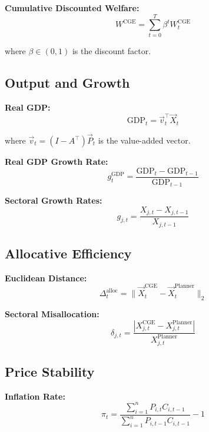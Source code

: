 \documentclass[12pt,a4paper]{article}
\theoremstyle{definition}
\theoremstyle{remark}
\begin{document}
\textbf{Cumulative Discounted Welfare:}
\begin{equation}
    W^{\text{CGE}} = \sum_{t=0}^T \beta^t W_t^{\text{CGE}}
\end{equation}

where $\beta \in (0,1)$ is the discount factor.

\subsection{Output and Growth}

\textbf{Real GDP:}
\begin{equation}
    \text{GDP}_t = \vec{v}_t^\top \vec{X}_t
\end{equation}

where $\vec{v}_t = (I - A^\top)\vec{P}_t$ is the value-added vector.

\textbf{Real GDP Growth Rate:}
\begin{equation}
    g_t^{\text{GDP}} = \frac{\text{GDP}_t - \text{GDP}_{t-1}}{\text{GDP}_{t-1}}
\end{equation}

\textbf{Sectoral Growth Rates:}
\begin{equation}
    g_{j,t} = \frac{X_{j,t} - X_{j,t-1}}{X_{j,t-1}}
\end{equation}

\subsection{Allocative Efficiency}

\textbf{Euclidean Distance:}
\begin{equation}
    \Delta_t^{\text{alloc}} = \|\vec{X}_t^{\text{CGE}} - \vec{X}_t^{\text{Planner}}\|_2
\end{equation}

\textbf{Sectoral Misallocation:}
\begin{equation}
    \delta_{j,t} = \frac{|X_{j,t}^{\text{CGE}} - X_{j,t}^{\text{Planner}}|}{X_{j,t}^{\text{Planner}}}
\end{equation}
\subsection{Price Stability}

\textbf{Inflation Rate:}
\begin{equation}
    \pi_t = \frac{\sum_{i=1}^n P_{i,t} C_{i,t-1}}{\sum_{i=1}^n P_{i,t-1} C_{i,t-1}} - 1
\end{equation}
\end{document}
